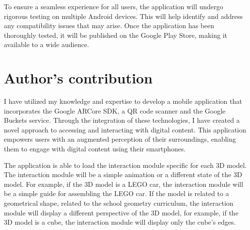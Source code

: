 To ensure a seamless experience for all users, the application will undergo rigorous testing on multiple Android devices. This will help identify and address any compatibility issues that may arise. Once the application has been thoroughly tested, it will be published on the Google Play Store, making it available to a wide audience.

\newpage
\section{Author's contribution}
I have utilized my knowledge and expertise to develop a mobile application that incorporates the Google ARCore \ac{SDK}, a \ac{QR} code scanner and the Google Buckets service. Through the integration of these technologies, I have created a novel approach to accessing and interacting with digital content. This application empowers users with an augmented perception of their surroundings, enabling them to engage with digital content using their smartphones.


The application is able to load the interaction module specific for each \ac{3D} model. The interaction module will be a simple animation or a different state of the \ac{3D} model. For example, if the \ac{3D} model is a LEGO car, the interaction module will be a simple guide for assembling the LEGO car. If the model is related to a geometrical shape, related to the school geometry curriculum, the interaction module will display a different perspective of the \ac{3D} model, for example, if the \ac{3D} model is a cube, the interaction module will display only the cube's edges.



